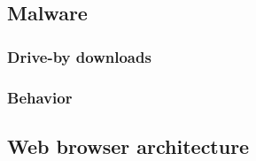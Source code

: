 
\subsection{Malware}
\subsubsection{Drive-by downloads}
\subsubsection{Behavior}


\subsection{Web browser architecture}



